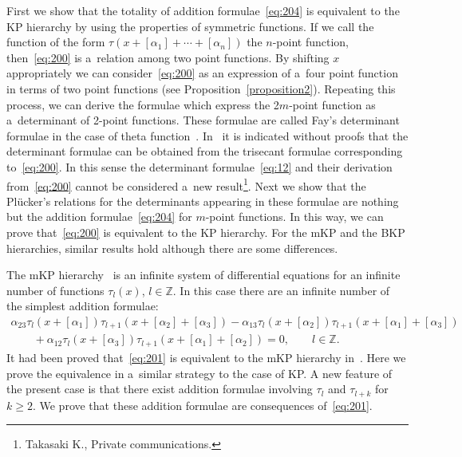 \documentclass[pdftex]{sigma}
\begin{document}
First we show that the totality of addition formulae~\eqref{eq:204} is equivalent to the KP hierarchy by
using the properties of symmetric functions.
If we call the function of the form $\tau(x+[\alpha_1]+\cdots+[\alpha_n])$ the $n$-point function,
then~\eqref{eq:200} is a~relation among two point functions.
By shifting $x$ appropriately we can consider~\eqref{eq:200} as an expression of a~four point function in
terms of two point functions (see Proposition~\ref{proposition2}).
Repeating this process, we can derive the formulae which express the 2$m$-point function as a~determinant
of 2-point functions.
These formulae are called Fay's determinant formulae in the case of theta function~\cite{F1,R1}.
In~\cite{F1} it is indicated without proofs that the determinant formulae can be obtained from the
trisecant formulae corresponding to~\eqref{eq:200}.
In this sense the determinant formulae~\eqref{eq:12} and their derivation from~\eqref{eq:200} cannot be
considered a~new result\footnote{Takasaki K., Private communications.}. %
Next we show that the Pl\"{u}cker's relations for the determinants appearing in these formulae are nothing
but the addition formulae~\eqref{eq:204} for $m$-point functions.
In this way, we can prove that~\eqref{eq:200} is equivalent to the KP hierarchy.
For the mKP and the BKP hierarchies, similar results hold although there are some dif\/ferences.

The mKP hierarchy~\cite{JM1} is an inf\/inite system of dif\/ferential equations for an inf\/inite number
of functions $\tau_l(x)$, $l\in\mathbb{Z}$.
In this case there are an inf\/inite number of the simplest addition formulae:
\begin{gather}
\alpha_{23}\tau_l(x+[\alpha_1])\tau_{l+1}(x+[\alpha_2]+[\alpha_3])
-\alpha_{13}\tau_l(x+[\alpha_2])\tau_{l+1}(x+[\alpha_1]+[\alpha_3])
\nonumber
\\
\qquad
{}+\alpha_{12}\tau_l(x+[\alpha_3])\tau_{l+1}(x+[\alpha_1]+[\alpha_2])=0,\qquad  l\in\mathbb{Z}.
\label{eq:201}
\end{gather}
It had been proved that~\eqref{eq:201} is equivalent to the mKP hierarchy in~\cite{NT1}.
Here we prove the equivalence in a~similar strategy to the case of KP.
A new feature of the present case is that there exist addition formulae involving $\tau_l$ and $\tau_{l+k}$
for $k\ge2$.
We prove that these addition formulae are consequences of~\eqref{eq:201}.
\end{document}
